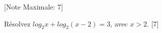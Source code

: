 \begin{question}
  \hspace*{\fill} [Note Maximale: 7]\par
  \medskip
  \noindent Résolvez $log_2x + log_2(x - 2) = 3$, avec $x > 2$.\hspace*{\fill} [7]\par
\end{question}
